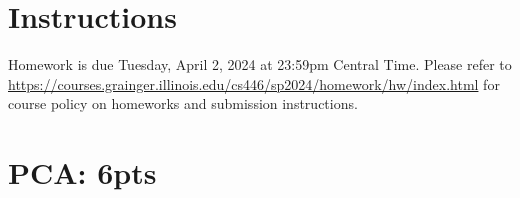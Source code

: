 \documentclass[12pt]{article}
\begin{document}
\singlespacing

\renewcommand{\familydefault}{\rmdefault}


\section{Instructions}

Homework is due Tuesday, April 2, 2024 at 23:59pm Central Time.
Please refer to \url{https://courses.grainger.illinois.edu/cs446/sp2024/homework/hw/index.html} for course policy on homeworks and submission instructions.


\section{PCA: 6pts}
\end{document}
